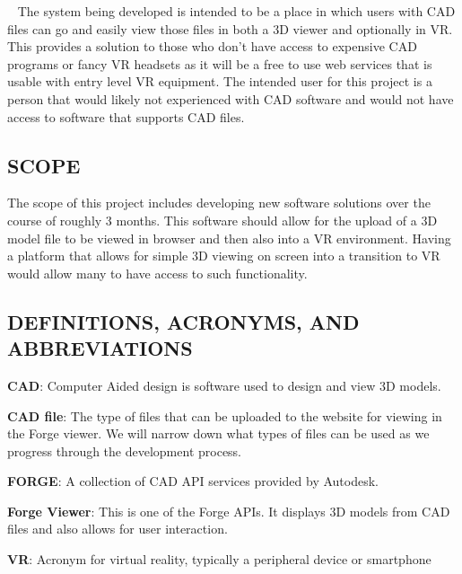 \documentclass[letterpaper, 10pt, draftclsnofoot, compsoc, onecolumn]{IEEEtran}
\begin{document}
\foreignlanguage{english}{\textit{}}\foreignlanguage{english}{ \ }
{\color{black}
	The system being developed is intended to be a place in which users with CAD files can go and easily view those files 
	in both a 3D viewer and optionally in VR. This provides a solution to those who don't have access to expensive CAD 
	programs or fancy VR headsets as it will be a free to use web services that is usable with entry level VR equipment. 
	The intended user for this project is a person that would likely not experienced with CAD software and would not have 
	access to software that supports CAD files.  
}

\subsection[SCOPE]{\rmfamily\bfseries\color{black}
SCOPE}
{\color{black}
	The scope of this project includes developing new software solutions over the course of roughly 3 months. This software
 	should allow for the upload of a 3D model file to be viewed in browser and then also into a VR environment. Having a 
	platform that allows for simple 3D viewing on screen into a transition to VR would allow many to have access to such 
	functionality. 
}

\subsection[DEFINITIONS, ACRONYMS, AND
ABBREVIATIONS]{\rmfamily\bfseries\color{black}
DEFINITIONS, ACRONYMS, AND ABBREVIATIONS}
{\color{black}
	\begin{flushleft}
	\textbf{CAD}: Computer Aided design is software used to design and view 3D models.

	\textbf{CAD file}: The type of files that can be uploaded to the website for viewing in the Forge viewer.
	We will  narrow down what types of files can be used as we progress through the development process.

	\textbf{FORGE}: A collection of CAD API services provided by Autodesk.

	\textbf{Forge Viewer}: This is one of the Forge APIs. It displays 3D models from CAD files and also allows
	for user interaction.

	\textbf{VR}: Acronym for virtual reality, typically a peripheral device or smartphone
	\end{flushleft} 
}
	
\end{document}
